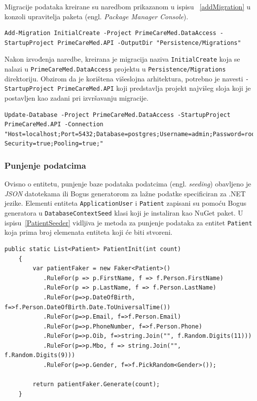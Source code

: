 Migracije podataka kreirane su naredbom prikazanom u ispisu ~\ref{addMigration} u konzoli upravitelja paketa (engl. \textit{Package Manager Console}). 

\begin{lstlisting}[caption={Naredba za kreiranje migracije}, label=addMigration]
Add-Migration InitialCreate -Project PrimeCareMed.DataAccess -StartupProject PrimeCareMed.API -OutputDir "Persistence/Migrations"
\end{lstlisting}

Nakon izvođenja naredbe, kreirana je migracija naziva \texttt{InitialCreate} koja se nalazi u \texttt{PrimeCareMed.DataAccess} projektu u \texttt{Persistence/Migrations} direktoriju. Obzirom da je korištena višeslojna arhitektura, potrebno je navesti \texttt{-StartupProject PrimeCareMed.API} koji predstavlja projekt najvišeg sloja koji je postavljen kao zadani pri izvršavanju migracije.

\begin{lstlisting}[caption={Primjena migracije na bazu podataka}, label=updateDatabase]
Update-Database -Project PrimeCareMed.DataAccess -StartupProject PrimeCareMed.API -Connection "Host=localhost;Port=5432;Database=postgres;Username=admin;Password=root;Integrated Security=true;Pooling=true;"
\end{lstlisting}

\subsubsection{Punjenje podatcima}
Ovisno o entitetu, punjenje baze podataka podatcima (engl. \textit{seeding}) obavljeno je \textit{JSON} datotekama ili Bogus generatorom za lažne podatke specificiran za .NET jezike. Elementi entiteta \texttt{ApplicationUser} i \texttt{Patient} zapisani su pomoću Bogus generatora u \texttt{DatabaseContextSeed} klasi koji je instaliran kao NuGet paket. U ispisu~\ref{PatientSeeder} vidljiva je metoda za punjenje podataka za entitet \texttt{Patient} koja prima broj elemenata entiteta koji će biti stvoreni.  \cite{bogus1}

\begin{lstlisting}[caption={\texttt{PatientInit} metoda za punjenje lažnih podataka}, label=PatientSeeder]
    public static List<Patient> PatientInit(int count)
    {
        var patientFaker = new Faker<Patient>()
           .RuleFor(p => p.FirstName, f => f.Person.FirstName)
           .RuleFor(p => p.LastName, f => f.Person.LastName)
           .RuleFor(p=>p.DateOfBirth, f=>f.Person.DateOfBirth.Date.ToUniversalTime())
           .RuleFor(p=>p.Email, f=>f.Person.Email)
           .RuleFor(p=>p.PhoneNumber, f=>f.Person.Phone)
           .RuleFor(p=>p.Oib, f=>string.Join("", f.Random.Digits(11)))
           .RuleFor(p=>p.Mbo, f => string.Join("", f.Random.Digits(9)))
           .RuleFor(p=>p.Gender, f=>f.PickRandom<Gender>());

        return patientFaker.Generate(count);
    }
\end{lstlisting}

